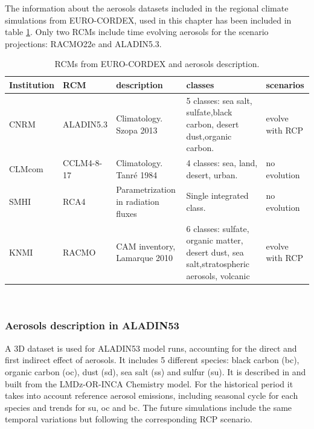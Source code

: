 The information about the aerosols datasets included in the regional climate simulations from EURO-CORDEX, used in this chapter has been included in table \ref{tb:aero}. Only two RCMs include time evolving aerosols for the scenario projections: RACMO22e and ALADIN5.3. %


\begin{table}[h!]
\caption[RCMs from EURO-CORDEX and aerosols description]{\label{tb:aero}RCMs from EURO-CORDEX and aerosols description.}
\footnotesize
\begin{tabular}{>{\raggedrigth}m{1.3cm}>{\raggedright}m{1.5cm}|>{\raggedright}m{2.2cm}>{\raggedright}m{2.2cm}>{\raggedright}m{2cm}}
\toprule 
Institution  & RCM & description & classes & scenarios \tabularnewline
\midrule
CNRM & ALADIN5.3 & Climatology. Szopa 2013 & 5 classes: sea salt, sulfate,black carbon, desert dust,organic carbon.& evolve with RCP \tabularnewline
CLMcom&CCLM4-8-17& Climatology. Tanré 1984 & 4 classes: sea, land, desert, urban.& no evolution\tabularnewline 
SMHI&RCA4& Parametrization in radiation fluxes & Single integrated class.& no evolution \tabularnewline
KNMI&RACMO&CAM inventory, Lamarque 2010 & 6 classes: sulfate, organic matter, desert dust, sea salt,stratospheric aerosols, volcanic & evolve with RCP\tabularnewline
\bottomrule
\end{tabular}\\
\end{table}
\normalsize

\subsubsection{Aerosols description in ALADIN53}

A 3D dataset is used for ALADIN53 model runs, accounting for the direct and first indirect effect of aerosols. It includes 5 different species: black carbon (bc), organic carbon (oc), dust (sd), sea salt (ss) and sulfur (su). It is described in \cite*{Szopa2013} and built from the LMDz-OR-INCA Chemistry model. For the historical period it takes into account reference aerosol emissions, including seasonal cycle for each species and trends for su, oc and bc. The future simulations include the same temporal variations but following the corresponding RCP scenario. 


